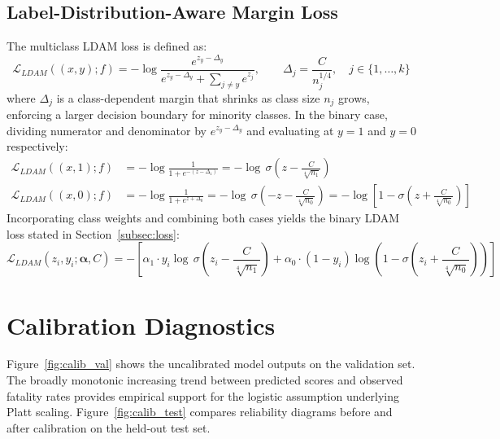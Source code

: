 \documentclass{article}
\begin{document}
\subsection{Label-Distribution-Aware Margin Loss}
The multiclass LDAM loss is defined as:\cite{LDAM}
\begin{equation*}
    \mathcal{L}_{LDAM}((x,y); f) = -\log \frac{e^{z_y - \Delta_y}}{e^{z_y - 
    \Delta_y} + \sum_{j \ne y} e^{z_j}}, \qquad \Delta_j = \frac{C}{n_j^{1/4}}, 
    \quad j \in \{1,\ldots,k\}
\end{equation*}
where $\Delta_j$ is a class-dependent margin that shrinks as class size $n_j$ grows, 
enforcing a larger decision boundary for minority classes. In the binary case, 
dividing numerator and denominator by $e^{z_y - \Delta_y}$ and evaluating at $y=1$ 
and $y=0$ respectively:
\begin{align*}
    \mathcal{L}_{LDAM}((x,1); f) 
        &= -\log \frac{1}{1 + e^{-(z-\Delta_1)}}
        = -\log\,\sigma\!\left(z - \frac{C}{\sqrt[4]{n_1}}\right) \\[6pt]
    \mathcal{L}_{LDAM}((x,0); f) 
        &= -\log \frac{1}{1 + e^{z+\Delta_0}}
        = -\log\,\sigma\!\left(-z - \frac{C}{\sqrt[4]{n_0}}\right)
        = -\log\!\left[1 - \sigma\!\left(z + \frac{C}{\sqrt[4]{n_0}}\right)\right]
\end{align*}
Incorporating class weights and combining both cases yields the binary LDAM loss 
stated in Section~\ref{subsec:loss}:
\begin{equation*}
    \mathcal{L}_{LDAM}(z_i, y_i;\boldsymbol{\alpha}, C) = -\left[
        \alpha_1 \cdot y_i \log\,\sigma\!\left(z_i - \frac{C}{\sqrt[4]{n_1}}\right) 
        + \alpha_0\cdot(1-y_i)\log\!\left(1-\sigma\!\left(z_i+
        \frac{C}{\sqrt[4]{n_0}}\right)\right)\right]
\end{equation*}

\newpage
\section{Calibration Diagnostics}
\label{appendix:figures}

Figure~\ref{fig:calib_val} shows the uncalibrated model outputs on the validation 
set. The broadly monotonic increasing trend between predicted scores and observed 
fatality rates provides empirical support for the logistic assumption underlying 
Platt scaling. Figure~\ref{fig:calib_test} compares reliability diagrams before 
and after calibration on the held-out test set.
\end{document}
